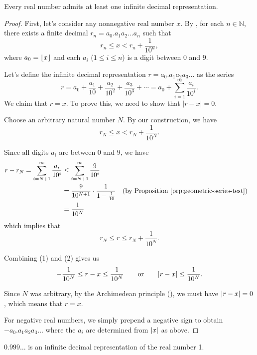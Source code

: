 \begin{theorem}
  Every real number admits at least one infinite decimal representation.
\end{theorem}

\begin{proof}
  First, let's consider any nonnegative real number $x$. By
  , for each $n \in \mathbb{N}$,
  there exists a finite decimal $r_n = a_0.a_1a_2\ldots a_n$ such that
  \[ r_n \leq x < r_n + \frac{1}{10^n}, \]
  where $a_0 = \lfloor x \rfloor$ and each $a_i$ ($1 \leq i \leq n$) is a
  digit between $0$ and $9$.

  Let's define the infinite decimal representation $r = a_0.a_1 a_2
  a_3 \ldots$ as the series
  \[ r = a_0 + \frac{a_1}{10} + \frac{a_2}{10^2} + \frac{a_3}{10^3} +
  \cdots = a_0 + \sum_{i=1}^{\infty} \frac{a_i}{10^i}. \]
  We claim that $r = x$. To prove this, we need to show that $|r - x| = 0$.

  Choose an arbitrary natural number $N$. By our construction, we have
  \[ r_N \leq x < r_N + \frac{1}{10^N}. \tag{1} \]

  Since all digits $a_i$ are between $0$ and $9$, we have
  \begin{align*}
    r - r_N = \sum_{i=N+1}^{\infty} \frac{a_i}{10^i} & \leq
    \sum_{i=N+1}^{\infty} \frac{9}{10^i} \\
    & = \frac{9}{10^{N+1}} \cdot \frac{1}{1-\frac{1}{10}} &&
    \text{(by \prpref{geometric-series-test})} \\
    & = \frac{1}{10^N}
  \end{align*}
  which implies that
  \[ r_N \leq r \leq r_N + \frac{1}{10^N}. \tag{2} \]

  Combining (1) and (2) gives us
  \[ -\frac{1}{10^N} \leq r - x \leq \frac{1}{10^N} \qquad \text{or}
  \qquad | r - x | \leq \frac{1}{10^N}. \]

  Since $N$ was arbitrary, by the Archimedean principle
  (), we must have $| r - x | = 0$,
  which means that $r = x$.

  For negative real numbers, we simply prepend a negative sign to
  obtain $-a_0. a_1 a_2 a_3 \ldots$ where the $a_i$ are determined from
  $| x |$ as above.
\end{proof}

\begin{theorem}[$0.999\ldots = 1$]
  $0.999\ldots$ is an infinite decimal representation of the real number 1.
\end{theorem}


